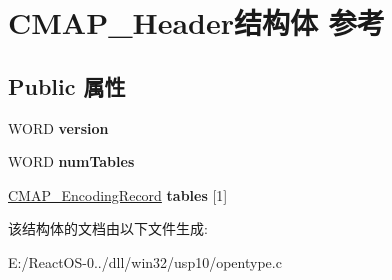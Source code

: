 \hypertarget{struct_c_m_a_p___header}{}\section{C\+M\+A\+P\+\_\+\+Header结构体 参考}
\label{struct_c_m_a_p___header}
\subsection*{Public 属性}
\begin{DoxyCompactItemize}
\item 
\mbox{\label{struct_c_m_a_p___header_af78629f19995a80022c0648bd432b045}} 
W\+O\+RD {\bfseries version}
\item 
\mbox{\label{struct_c_m_a_p___header_af04e5622353c610532909f5c025f483c}} 
W\+O\+RD {\bfseries num\+Tables}
\item 
\mbox{\label{struct_c_m_a_p___header_a968bf2550c6d3e1fa9a16bed034659dc}} 
\hyperlink{struct_c_m_a_p___encoding_record}{C\+M\+A\+P\+\_\+\+Encoding\+Record} {\bfseries tables} \mbox{[}1\mbox{]}
\end{DoxyCompactItemize}


该结构体的文档由以下文件生成\+:\begin{DoxyCompactItemize}
\item 
E\+:/\+React\+O\+S-\/0../dll/win32/usp10/opentype.\+c\end{DoxyCompactItemize}
